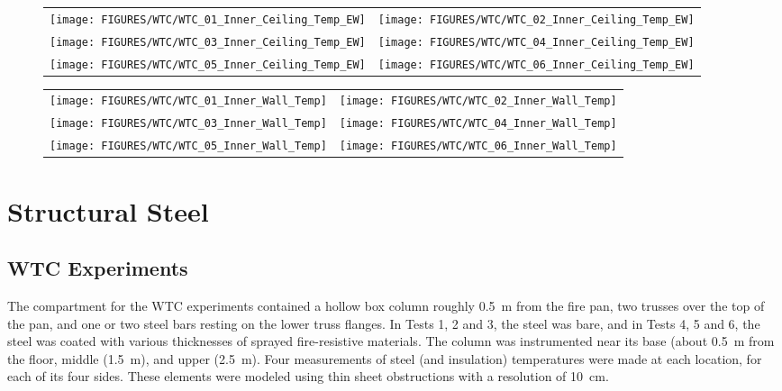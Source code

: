 \begin{figure}[p]
\begin{tabular*}{\textwidth}{l@{\extracolsep{\fill}}r}
\texttt{[image: FIGURES/WTC/WTC\_01\_Inner\_Ceiling\_Temp\_EW]} &
\texttt{[image: FIGURES/WTC/WTC\_02\_Inner\_Ceiling\_Temp\_EW]} \\
\texttt{[image: FIGURES/WTC/WTC\_03\_Inner\_Ceiling\_Temp\_EW]} &
\texttt{[image: FIGURES/WTC/WTC\_04\_Inner\_Ceiling\_Temp\_EW]} \\
\texttt{[image: FIGURES/WTC/WTC\_05\_Inner\_Ceiling\_Temp\_EW]} &
\texttt{[image: FIGURES/WTC/WTC\_06\_Inner\_Ceiling\_Temp\_EW]}
\end{tabular*}
\label{NIST_WTC_Inner_Ceiling_EW}
\end{figure}

\begin{figure}[p]
\begin{tabular*}{\textwidth}{l@{\extracolsep{\fill}}r}
\texttt{[image: FIGURES/WTC/WTC\_01\_Inner\_Wall\_Temp]} &
\texttt{[image: FIGURES/WTC/WTC\_02\_Inner\_Wall\_Temp]} \\
\texttt{[image: FIGURES/WTC/WTC\_03\_Inner\_Wall\_Temp]} &
\texttt{[image: FIGURES/WTC/WTC\_04\_Inner\_Wall\_Temp]} \\
\texttt{[image: FIGURES/WTC/WTC\_05\_Inner\_Wall\_Temp]} &
\texttt{[image: FIGURES/WTC/WTC\_06\_Inner\_Wall\_Temp]}
\end{tabular*}
\label{NIST_WTC_Inner_Wall}
\end{figure}

\clearpage


\section{Structural Steel}



\subsection{WTC Experiments}

The compartment for the WTC experiments contained a hollow box column roughly 0.5~m from the fire pan, two trusses over the top of the pan, and one or two steel bars resting on the lower truss flanges. In Tests 1, 2 and 3, the steel was bare, and in Tests 4, 5 and 6, the steel was coated with various thicknesses of sprayed fire-resistive materials. The column was instrumented near its base (about 0.5~m from the floor, middle (1.5~m), and upper (2.5~m). Four measurements of steel (and insulation) temperatures were made at each location, for each of its four sides. These elements were modeled using thin sheet obstructions with a resolution of 10~cm.

